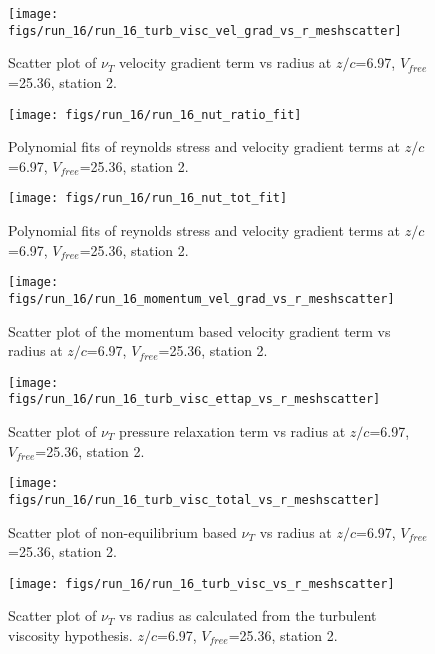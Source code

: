 \begin{figure}[H]
\centering
\texttt{[image: figs/run\_16/run\_16\_turb\_visc\_vel\_grad\_vs\_r\_meshscatter]}
\caption{Scatter plot of $\nu_T$ velocity gradient term vs radius at $z/c$=6.97, $V_{free}$=25.36, station 2.}
\end{figure}


\begin{figure}[H]
\centering
\texttt{[image: figs/run\_16/run\_16\_nut\_ratio\_fit]}
\caption{Polynomial fits of reynolds stress and velocity gradient terms at $z/c$=6.97, $V_{free}$=25.36, station 2.}
\end{figure}


\begin{figure}[H]
\centering
\texttt{[image: figs/run\_16/run\_16\_nut\_tot\_fit]}
\caption{Polynomial fits of reynolds stress and velocity gradient terms at $z/c$=6.97, $V_{free}$=25.36, station 2.}
\end{figure}


\begin{figure}[H]
\centering
\texttt{[image: figs/run\_16/run\_16\_momentum\_vel\_grad\_vs\_r\_meshscatter]}
\caption{Scatter plot of the momentum based velocity gradient term vs radius at $z/c$=6.97, $V_{free}$=25.36, station 2.}
\end{figure}


\begin{figure}[H]
\centering
\texttt{[image: figs/run\_16/run\_16\_turb\_visc\_ettap\_vs\_r\_meshscatter]}
\caption{Scatter plot of $\nu_T$ pressure relaxation term vs radius at $z/c$=6.97, $V_{free}$=25.36, station 2.}
\end{figure}


\begin{figure}[H]
\centering
\texttt{[image: figs/run\_16/run\_16\_turb\_visc\_total\_vs\_r\_meshscatter]}
\caption{Scatter plot of non-equilibrium based $\nu_T$ vs radius at $z/c$=6.97, $V_{free}$=25.36, station 2.}
\end{figure}


\begin{figure}[H]
\centering
\texttt{[image: figs/run\_16/run\_16\_turb\_visc\_vs\_r\_meshscatter]}
\caption{Scatter plot of $\nu_T$ vs radius as calculated from the turbulent viscosity hypothesis. $z/c$=6.97, $V_{free}$=25.36, station 2.}
\end{figure}


